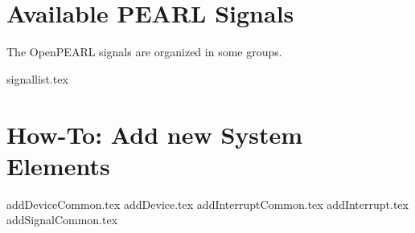 \documentclass[10pt]{scrbook}
\begin{document}
\chapter{Available PEARL Signals}
The OpenPEARL signals are organized in some groups.

{signallist.tex}


\chapter{How-To: Add new System Elements}
{addDeviceCommon.tex}
{addDevice.tex}
{addInterruptCommon.tex}
{addInterrupt.tex}
{addSignalCommon.tex}
\end{document}
